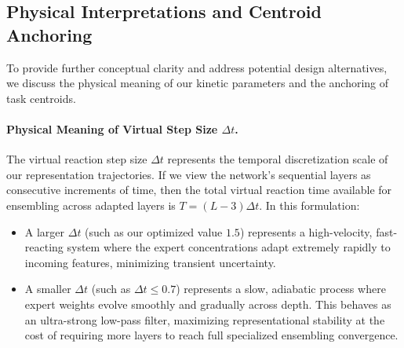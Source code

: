 \subsection{Physical Interpretations and Centroid Anchoring}
\label{sec:interpretation}

To provide further conceptual clarity and address potential design alternatives, we discuss the physical meaning of our kinetic parameters and the anchoring of task centroids.

\paragraph{Physical Meaning of Virtual Step Size $\Delta t$.} 
The virtual reaction step size $\Delta t$ represents the temporal discretization scale of our representation trajectories. If we view the network's sequential layers as consecutive increments of time, then the total virtual reaction time available for ensembling across adapted layers is $T = (L-3)\Delta t$. In this formulation:
\begin{itemize}
    \item A larger $\Delta t$ (such as our optimized value $1.5$) represents a high-velocity, fast-reacting system where the expert concentrations adapt extremely rapidly to incoming features, minimizing transient uncertainty.
    \item A smaller $\Delta t$ (such as $\Delta t \le 0.7$) represents a slow, adiabatic process where expert weights evolve smoothly and gradually across depth. This behaves as an ultra-strong low-pass filter, maximizing representational stability at the cost of requiring more layers to reach full specialized ensembling convergence.
\end{itemize}


